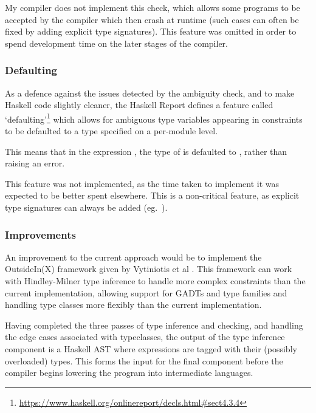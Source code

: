 \documentclass[dissertation.tex]{subfiles}
\begin{document}
{{{            My compiler does not implement this check, which allows some programs to be accepted by the compiler which
            then crash at runtime (such cases can often be fixed by adding explicit type signatures). This feature was
            omitted in order to spend development time on the later stages of the compiler.


        }
        \subsubsection{Defaulting}
        {

            As a defence against the issues detected by the ambiguity check, and to make Haskell code slightly cleaner,
            the Haskell Report defines a feature called
            `defaulting'\footnote{\url{https://www.haskell.org/onlinereport/decls.html\#sect4.3.4}} which allows for
            ambiguous type variables appearing in  constraints to be defaulted to a type specified on a
            per-module level.

            This means that in the expression , the type of  is defaulted to
            , rather than raising an error.

            This feature was not implemented, as the time taken to implement it was expected to be better spent
            elsewhere. This is a non-critical feature, as explicit type signatures can always be added (eg.\
            ).

        }
        \subsubsection{Improvements}
        {

            An improvement to the current approach would be to implement the OutsideIn(X) framework given by Vytiniotis
            et al \cite{OutsideIn}. This framework can work with Hindley-Milner type inference to handle more complex
            constraints than the current implementation, allowing support for GADTs and type families and handling type
            classes more flexibly than the current implementation.

        }

        \vspace{0.5cm}
        Having completed the three passes of type inference and checking, and handling the edge cases associated with
        typeclasses, the output of the type inference component is a Haskell AST where expressions are tagged with their
        (possibly overloaded) types. This forms the input for the final component before the compiler begins lowering
        the program into intermediate languages.

}}
\end{document}
